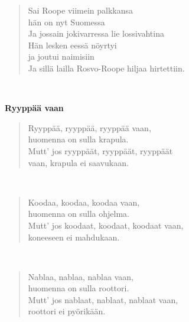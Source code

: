 \noindent\begin{minipage}{\linewidth}
\begin{verse}
	Sai Roope viimein palkkansa\\
	hän on nyt Suomessa\\
	Ja jossain jokivarressa lie lossivahtina\\
	Hän lesken eessä nöyrtyi\\
	ja joutui naimisiin\\
	Ja sillä lailla Rosvo-Roope hiljaa hirtettiin.\\
\end{verse}
\end{minipage}\\[10pt]
%
%
\noindent\begin{minipage}{\linewidth}
\vspace{5pt}
\parbox[t]{0.85\linewidth}{\raggedright {\large\bf Ryyppää vaan}\\[6pt]}
\begin{verse}
	Ryyppää, ryyppää, ryyppää vaan,\\
	huomenna on sulla krapula.\\
	Mutt' jos ryyppäät, ryyppäät, ryyppäät\\
	vaan, krapula ei saavukaan.\\
\end{verse}
\end{minipage}\\[10pt]
\noindent\begin{minipage}{\linewidth}
\begin{verse}
	Koodaa, koodaa, koodaa vaan,\\
	huomenna on sulla ohjelma.\\
	Mutt' jos koodaat, koodaat, koodaat vaan,\\
	koneeseen ei mahdukaan.\\
\end{verse}
\end{minipage}\\[10pt]
\noindent\begin{minipage}{\linewidth}
\begin{verse}
	Nablaa, nablaa, nablaa vaan,\\
	huomenna on sulla roottori.\\
	Mutt' jos nablaat, nablaat, nablaat vaan,\\
	roottori ei pyörikään.\\
\end{verse}
\end{minipage}\\[10pt]
